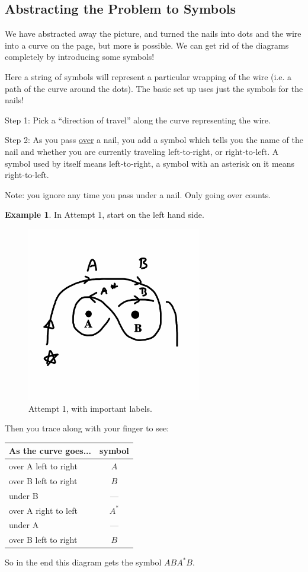\documentclass[12pt,letterpaper]{article}
\theoremstyle{definition}
\newtheorem{example}{Example}
\begin{document}
\clearpage
\subsection*{Abstracting the Problem to Symbols}

We have abstracted away the picture, and turned the nails into dots and the wire into a curve on the page, but more is possible.
We can get rid of the diagrams completely by introducing some symbols!

Here a string of symbols will represent a particular wrapping of the wire (i.e. a path of the curve around the dots).
The basic set up uses just the symbols for the nails!

\noindent
Step 1: Pick a ``direction of travel'' along the curve representing the wire.

\noindent
Step 2: As you pass \underline{over} a nail, you add a symbol which tells you the name of the nail and whether you are currently traveling left-to-right, or right-to-left. A symbol used by itself means left-to-right, a symbol with an asterisk on it means right-to-left.

Note: you ignore any time you pass under a nail. Only going over counts.

\begin{example}
In Attempt 1, start on the left hand side.
\begin{figure}[h]
    \centering
    \includegraphics[height=3in]{phppics/coded.png}
    \caption{Attempt 1, with important labels.}
\end{figure}
Then you trace along with your finger to see:\\
\begin{center}
\begin{tabular}{lc}
As the curve goes... & symbol \\
\hline
over A left to right & $A$\\
over B left to right & $B$\\
under B & --- \\
over A right to left & $A^*$\\
under A & --- \\
over B left to right & $B$ 
\end{tabular}
\end{center}
So in the end this diagram gets the symbol $ABA^*B$.
\end{example}
\end{document}
